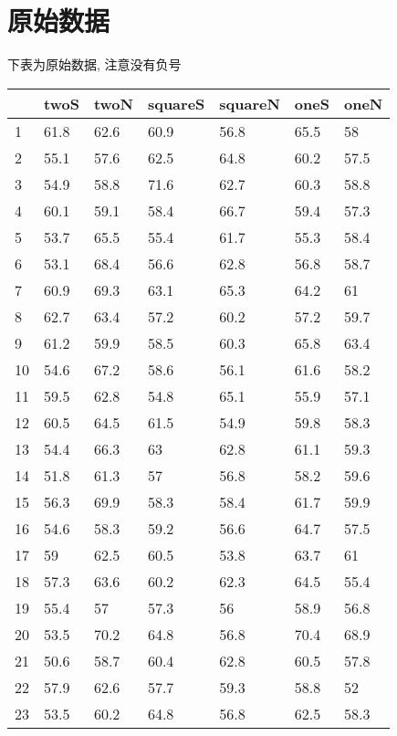 \newpage
\appendix
\section{原始数据}
下表为原始数据, 注意没有负号

\begin{longtable}{lllllll}
  \toprule
    & twoS & twoN & squareS & squareN & oneS & oneN \\
	\midrule
1   & 61.8 & 62.6 & 60.9    & 56.8    & 65.5 & 58   \\
2   & 55.1 & 57.6 & 62.5    & 64.8    & 60.2 & 57.5 \\
3   & 54.9 & 58.8 & 71.6    & 62.7    & 60.3 & 58.8 \\
4   & 60.1 & 59.1 & 58.4    & 66.7    & 59.4 & 57.3 \\
5   & 53.7 & 65.5 & 55.4    & 61.7    & 55.3 & 58.4 \\
6   & 53.1 & 68.4 & 56.6    & 62.8    & 56.8 & 58.7 \\
7   & 60.9 & 69.3 & 63.1    & 65.3    & 64.2 & 61   \\
8   & 62.7 & 63.4 & 57.2    & 60.2    & 57.2 & 59.7 \\
9   & 61.2 & 59.9 & 58.5    & 60.3    & 65.8 & 63.4 \\
10  & 54.6 & 67.2 & 58.6    & 56.1    & 61.6 & 58.2 \\
11  & 59.5 & 62.8 & 54.8    & 65.1    & 55.9 & 57.1 \\
12  & 60.5 & 64.5 & 61.5    & 54.9    & 59.8 & 58.3 \\
13  & 54.4 & 66.3 & 63      & 62.8    & 61.1 & 59.3 \\
14  & 51.8 & 61.3 & 57      & 56.8    & 58.2 & 59.6 \\
15  & 56.3 & 69.9 & 58.3    & 58.4    & 61.7 & 59.9 \\
16  & 54.6 & 58.3 & 59.2    & 56.6    & 64.7 & 57.5 \\
17  & 59   & 62.5 & 60.5    & 53.8    & 63.7 & 61   \\
18  & 57.3 & 63.6 & 60.2    & 62.3    & 64.5 & 55.4 \\
19  & 55.4 & 57   & 57.3    & 56      & 58.9 & 56.8 \\
20  & 53.5 & 70.2 & 64.8    & 56.8    & 70.4 & 68.9 \\
21  & 50.6 & 58.7 & 60.4    & 62.8    & 60.5 & 57.8 \\
22  & 57.9 & 62.6 & 57.7    & 59.3    & 58.8 & 52   \\
23  & 53.5 & 60.2 & 64.8    & 56.8    & 62.5 & 58.3 \\

\end{longtable}
